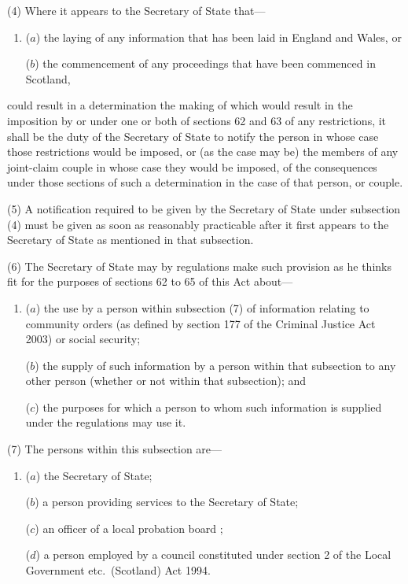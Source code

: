 \documentclass[12pt,a4paper]{article}
\begin{document}
(4) Where it appears to the Secretary of State that—
\begin{enumerate}\item[]
($a$) the laying of any information that has been laid in England and Wales, or

($b$) the commencement of any proceedings that have been commenced in Scotland,
\end{enumerate}
could result in a determination the making of which would result in the imposition by or under one or both of sections 62 and 63 of any restrictions, it shall be the duty of the Secretary of State to notify the person in whose case those restrictions would be imposed, or (as the case may be) the members of any joint-claim couple in whose case they would be imposed, of the consequences under those sections of such a determination in the case of that person, or couple.

(5) A notification required to be given by the Secretary of State under subsection (4)  must be given as soon as reasonably practicable after it first appears to the Secretary of State as mentioned in that subsection.

(6) The Secretary of State may by regulations make such provision as he thinks fit for the purposes of sections 62 to 65 of this Act about—
\begin{enumerate}\item[]
($a$) the use by a person within subsection (7)  of information relating to community orders 
(as defined by section 177 of the Criminal Justice Act 2003)  %
or social security;

($b$) the supply of such information by a person within that subsection to any other person (whether or not within that subsection); and

($c$) the purposes for which a person to whom such information is supplied under the regulations may use it.
\end{enumerate}

(7) The persons within this subsection are—
\begin{enumerate}\item[]
($a$) the Secretary of State;

($b$) a person providing services to the Secretary of State;

($c$) %
an officer of a local probation board%
;

($d$) a person employed by a council constituted under section 2 of the Local Government etc.\ (Scotland) Act 1994. 
\end{enumerate}
\end{document}
